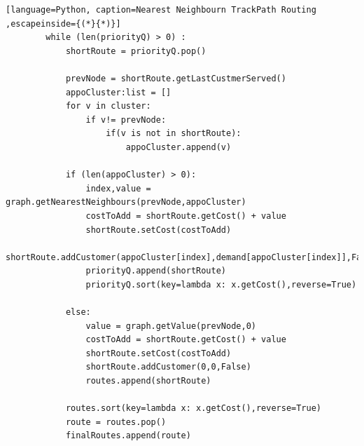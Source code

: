 \documentclass[]{article}
\begin{document}
\begin{itemize}
\begin{lstlisting}[language=Python, caption=Nearest Neighbourn TrackPath Routing ,escapeinside={(*}{*)}]
		while (len(priorityQ) > 0) :
			shortRoute = priorityQ.pop()
			
			prevNode = shortRoute.getLastCustmerServed()
			appoCluster:list = []
			for v in cluster:
				if v!= prevNode:
					if(v is not in shortRoute):
						appoCluster.append(v)
					
			if (len(appoCluster) > 0):
				index,value = graph.getNearestNeighbours(prevNode,appoCluster)
				costToAdd = shortRoute.getCost() + value
				shortRoute.setCost(costToAdd)
				shortRoute.addCustomer(appoCluster[index],demand[appoCluster[index]],False)
				priorityQ.append(shortRoute)
				priorityQ.sort(key=lambda x: x.getCost(),reverse=True)
				
			else:
				value = graph.getValue(prevNode,0)
				costToAdd = shortRoute.getCost() + value
				shortRoute.setCost(costToAdd)
				shortRoute.addCustomer(0,0,False)               
				routes.append(shortRoute)
			
			routes.sort(key=lambda x: x.getCost(),reverse=True)
			route = routes.pop()
			finalRoutes.append(route)
	

\end{lstlisting}
\end{itemize}
\end{document}
